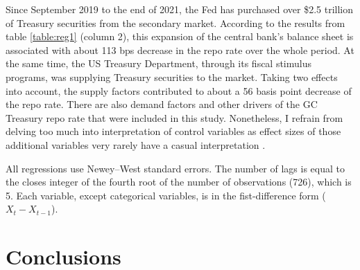 \documentclass[11pt,a4paper,english,oneside]{article}
\begin{document}
Since September 2019 to the end of 2021, the Fed has purchased over \$2.5 trillion of Treasury securities from the secondary market. According to the results from table \ref{table:reg1} (column 2), this expansion of the central bank's balance sheet is associated with about 113 bps decrease in the repo rate over the whole period. At the same time, the US Treasury Department, through its fiscal stimulus programs, was supplying Treasury securities to the market. Taking two effects into account, the supply factors contributed to about a 56 basis point decrease of the repo rate. There are also demand factors and other drivers of the GC Treasury repo rate that were included in this study. Nonetheless, I refrain from delving too much into interpretation of control variables as effect sizes of those additional variables very rarely have a casual interpretation \citet{hunermund2020}.

All regressions use Newey–West standard errors. The number of lags is equal to the closes integer of the fourth root of the number of observations (726), which is 5. Each variable, except categorical variables, is in the fist-difference form ($X_t-X_{t-1}$).

\newpage %

\section{Conclusions} \label{sec:conclusion} 


\newpage


\end{document}
